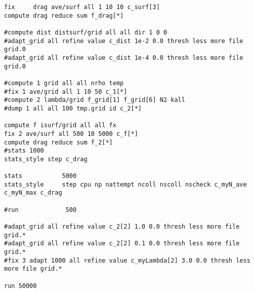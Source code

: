 \begin{lstlisting}[caption={SPARTAカーネルの入力ファイル例},label={list:sparta}]
fix     drag ave/surf all 1 10 10 c_surf[3]
compute drag reduce sum f_drag[*]

#compute dist distsurf/grid all all dir 1 0 0
#adapt_grid all refine value c_dist 1e-2 0.0 thresh less more file grid.0
#adapt_grid all refine value c_dist 1e-4 0.0 thresh less more file grid.0

#compute 1 grid all all nrho temp
#fix 1 ave/grid all 1 10 50 c_1[*]
#compute 2 lambda/grid f_grid[1] f_grid[6] N2 kall
#dump 1 all all 100 tmp.grid id c_2[*]

compute f isurf/grid all all fx
fix 2 ave/surf all 500 10 5000 c_f[*]
compute drag reduce sum f_2[*]
#stats 1000
stats_style step c_drag

stats           5000
stats_style     step cpu np nattempt ncoll nscoll nscheck c_myN_ave c_myN_max c_drag

#run             500

#adapt_grid all refine value c_2[2] 1.0 0.0 thresh less more file grid.*
#adapt_grid all refine value c_2[2] 0.1 0.0 thresh less more file grid.*
#fix 3 adapt 1000 all refine value c_myLambda[2] 3.0 0.0 thresh less more file grid.*

run 50000
\end{lstlisting}